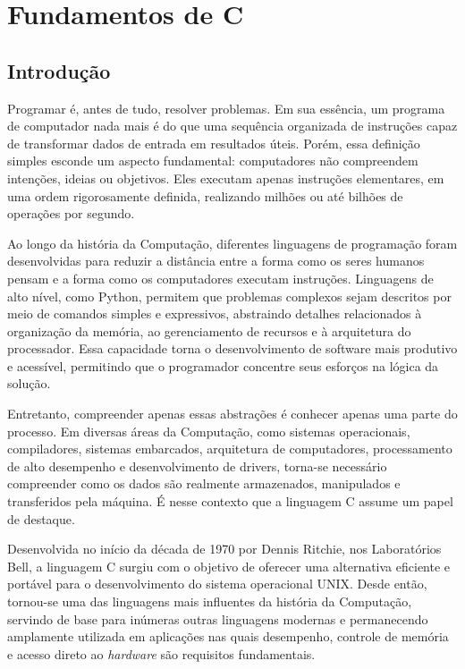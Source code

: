 \documentclass[12pt,a4paper,oneside]{extreport}
\begin{document}
\part{Fundamentos de C}

\chapter{Introdução}

Programar é, antes de tudo, resolver problemas. Em sua essência, um programa de computador nada mais é do que uma sequência organizada de instruções capaz de transformar dados de entrada em resultados úteis. 
Porém, essa definição simples esconde um aspecto fundamental: computadores não compreendem intenções, ideias ou objetivos.
Eles executam apenas instruções elementares, em uma ordem rigorosamente definida, realizando milhões ou até bilhões de operações por segundo.

Ao longo da história da Computação, diferentes linguagens de programação foram desenvolvidas para reduzir a distância entre a forma como os seres humanos pensam e a forma como os computadores executam instruções. 
Linguagens de alto nível, como Python, permitem que problemas complexos sejam descritos por meio de comandos simples e expressivos, 
abstraindo detalhes relacionados à organização da memória, ao gerenciamento de recursos e à arquitetura do processador. 
Essa capacidade torna o desenvolvimento de software mais produtivo e acessível, permitindo que o programador concentre seus esforços na lógica da solução.

Entretanto, compreender apenas essas abstrações é conhecer apenas uma parte do processo. Em diversas áreas da Computação, como sistemas operacionais, compiladores, sistemas embarcados, 
arquitetura de computadores, processamento de alto desempenho e desenvolvimento de drivers, torna-se necessário compreender como os dados são realmente armazenados, manipulados e transferidos pela máquina. 
É nesse contexto que a linguagem C assume um papel de destaque.

Desenvolvida no início da década de 1970 por Dennis Ritchie, nos Laboratórios Bell, a linguagem C surgiu com o objetivo de oferecer uma alternativa eficiente e portável para o desenvolvimento do sistema operacional UNIX. 
Desde então, tornou-se uma das linguagens mais influentes da história da Computação, servindo de base para inúmeras outras linguagens modernas e 
permanecendo amplamente utilizada em aplicações nas quais desempenho, controle de memória e acesso direto ao \textit{hardware} são requisitos fundamentais.
\end{document}

